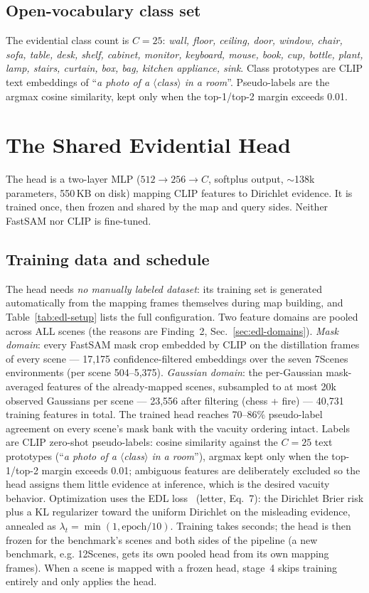 \documentclass[journal]{IEEEtran}
\begin{document}
\subsection{Open-vocabulary class set}
The evidential class count is $C{=}25$:
\emph{wall, floor, ceiling, door, window, chair, sofa, table, desk, shelf,
cabinet, monitor, keyboard, mouse, book, cup, bottle, plant, lamp, stairs,
curtain, box, bag, kitchen appliance, sink}. Class prototypes are CLIP text
embeddings of ``\emph{a photo of a $\langle$class$\rangle$ in a room}''.
Pseudo-labels are the argmax cosine similarity, kept only when the
top-1/top-2 margin exceeds 0.01.

\section{The Shared Evidential Head}
\label{sec:edl}

The head is a two-layer MLP ($512 \to 256 \to C$, softplus output,
$\sim$138k parameters, 550\,KB on disk) mapping CLIP features to Dirichlet
evidence. It is trained once, then frozen and shared by the map and query
sides. Neither FastSAM nor CLIP is fine-tuned.

\subsection{Training data and schedule}
\label{sec:edl-training}
The head needs \emph{no manually labeled dataset}: its training set is
generated automatically from the mapping frames themselves during map
building, and Table~\ref{tab:edl-setup} lists the full configuration. Two
feature domains are pooled across ALL scenes (the reasons are Finding~2,
Sec.~\ref{sec:edl-domains}). \emph{Mask domain}: every FastSAM mask crop
embedded by CLIP on the distillation frames of every scene --- 17{,}175
confidence-filtered embeddings over the seven 7Scenes environments (per
scene 504--5{,}375). \emph{Gaussian domain}: the per-Gaussian mask-averaged
features of the already-mapped scenes, subsampled to at most 20k observed
Gaussians per scene --- 23{,}556 after filtering (chess + fire) ---
40{,}731 training features in total. The trained head reaches 70--86\%
pseudo-label agreement on every scene's mask bank with the vacuity ordering
intact. Labels are CLIP zero-shot pseudo-labels: cosine
similarity against the $C{=}25$ text prototypes (``\emph{a photo of a
$\langle$class$\rangle$ in a room}''), argmax kept only when the
top-1/top-2 margin exceeds 0.01; ambiguous features are deliberately
excluded so the head assigns them little evidence at inference, which is
the desired vacuity behavior. Optimization uses the EDL loss~\cite{edl}
(letter, Eq.~7): the Dirichlet Brier risk plus a KL regularizer toward the
uniform Dirichlet on the misleading evidence, annealed as
$\lambda_t = \min(1, \mathrm{epoch}/10)$. Training takes seconds; the head is then frozen for the benchmark's
scenes and both sides of the pipeline (a new benchmark, e.g. 12Scenes,
gets its own pooled head from its own mapping frames). When a scene
is mapped with a frozen head, stage~4 skips training entirely and only
applies the head.
\end{document}
